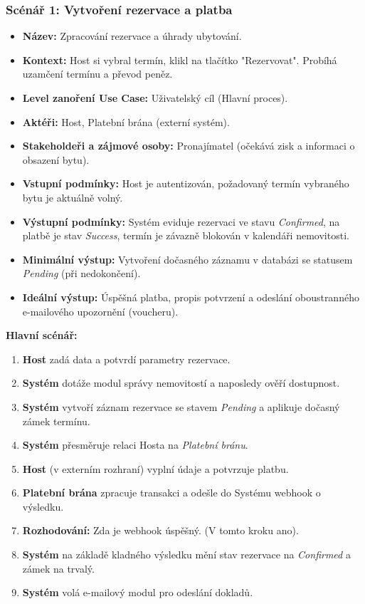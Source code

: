\documentclass[11pt, a4paper]{article}
\begin{document}
\subsubsection{Scénář 1: Vytvoření rezervace a platba}
\begin{itemize}[leftmargin=*]
    \item \textbf{Název:} Zpracování rezervace a úhrady ubytování.
    \item \textbf{Kontext:} Host si vybral termín, klikl na tlačítko "Rezervovat". Probíhá uzamčení termínu a převod peněz.
    \item \textbf{Level zanoření Use Case:} Uživatelský cíl (Hlavní proces).
    \item \textbf{Aktéři:} Host, Platební brána (externí systém).
    \item \textbf{Stakeholdeři a zájmové osoby:} Pronajímatel (očekává zisk a informaci o obsazení bytu).
    \item \textbf{Vstupní podmínky:} Host je autentizován, požadovaný termín vybraného bytu je aktuálně volný.
    \item \textbf{Výstupní podmínky:} Systém eviduje rezervaci ve stavu \textit{Confirmed}, na platbě je stav \textit{Success}, termín je závazně blokován v kalendáři nemovitosti.
    \item \textbf{Minimální výstup:} Vytvoření dočasného záznamu v databázi se statusem \textit{Pending} (při nedokončení).
    \item \textbf{Ideální výstup:} Úspěšná platba, propis potvrzení a odeslání oboustranného e-mailového upozornění (voucheru).
\end{itemize}

\noindent \textbf{Hlavní scénář:}
\begin{enumerate}
    \item \textbf{Host} zadá data a potvrdí parametry rezervace.
    \item \textbf{Systém} dotáže modul správy nemovitostí a naposledy ověří dostupnost.
    \item \textbf{Systém} vytvoří záznam rezervace se stavem \textit{Pending} a aplikuje dočasný zámek termínu.
    \item \textbf{Systém} přesměruje relaci Hosta na \textit{Platební bránu}.
    \item \textbf{Host} (v externím rozhraní) vyplní údaje a potvrzuje platbu.
    \item \textbf{Platební brána} zpracuje transakci a odešle do Systému webhook o výsledku.
    \item \textbf{Rozhodování:} Zda je webhook úspěšný. (V tomto kroku ano).
    \item \textbf{Systém} na základě kladného výsledku mění stav rezervace na \textit{Confirmed} a zámek na trvalý.
    \item \textbf{Systém} volá e-mailový modul pro odeslání dokladů.
\end{enumerate}
\end{document}

